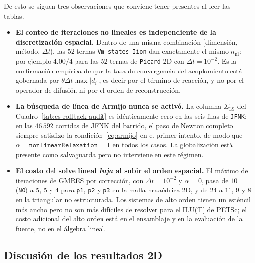 \documentclass[11pt,a4paper]{article}
\newcommand{\code}[1]{\texttt{\small #1}}
\begin{document}
De esto se siguen tres observaciones que conviene tener presentes al leer las tablas.

\begin{itemize}
\item \textbf{El conteo de iteraciones no lineales es independiente de la discretización
espacial.} Dentro de una misma combinación (dimensión, método, $\Delta t$), las $52$ ternas
\code{Vm-states-Iion} dan exactamente el mismo $n_{\mathrm{nl}}$: por ejemplo $4.00/4$ para
las $52$ ternas de \code{Picard} 2D con $\Delta t=10^{-2}$. Es la confirmación empírica de que
la tasa de convergencia del acoplamiento está gobernada por $\theta\Delta t\max|d_i|$, es
decir por el término de reacción, y no por el operador de difusión ni por el orden de
reconstrucción.

\item \textbf{La búsqueda de línea de Armijo nunca se activó.} La columna
$\Sigma_{\mathrm{LS}}$ del Cuadro~\ref{tab:es-rollback-audit} es idénticamente cero en
las seis filas de \code{JFNK}: en las $46\,592$ corridas de JFNK del barrido, el paso de
Newton completo siempre satisfizo la condición~\eqref{eq:armijo} en el primer intento, de modo
que $\alpha=\texttt{nonlinearRelaxation}=1$ en todos los casos. La globalización está presente
como salvaguarda pero no interviene en este régimen.

\item \textbf{El costo del solve lineal \emph{baja} al subir el orden espacial.} El máximo de
iteraciones de GMRES por corrección, con $\Delta t=10^{-2}$ y $\alpha=0$, pasa de $10$
(\code{NO}) a $5$, $5$ y $4$ para \code{p1}, \code{p2} y \code{p3} en la malla hexaédrica 2D,
y de $24$ a $11$, $9$ y $8$ en la triangular no estructurada. Los sistemas de alto orden
tienen un esténcil más ancho pero no son más difíciles de resolver para el ILU(T) de PETSc; el
costo adicional del alto orden está en el ensamblaje y en la evaluación de la fuente, no en el
álgebra lineal.
\end{itemize}



\FloatBarrier

\subsection{Discusión de los resultados 2D}
\label{sec:es-conclusiones-2d}
\end{document}

